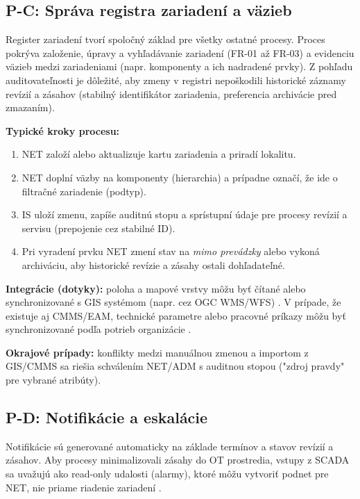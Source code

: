 \subsection{P-C: Správa registra zariadení a väzieb}
\label{sec:process-pc}

Register zariadení tvorí spoločný základ pre všetky ostatné procesy.
Proces pokrýva založenie, úpravy a vyhľadávanie zariadení (FR-01 až FR-03) a evidenciu väzieb medzi zariadeniami (napr. komponenty a ich nadradené prvky).
Z pohľadu auditovateľnosti je dôležité, aby zmeny v registri nepoškodili historické záznamy revízií a zásahov (stabilný identifikátor zariadenia, preferencia archivácie pred zmazaním).

\textbf{Typické kroky procesu:}
\begin{enumerate}[label=\arabic*.]
\item NET založí alebo aktualizuje kartu zariadenia a priradí lokalitu.
\item NET doplní väzby na komponenty (hierarchia) a prípadne označí, že ide o filtračné zariadenie (podtyp).
\item IS uloží zmenu, zapíše auditnú stopu a sprístupní údaje pre procesy revízií a servisu (prepojenie cez stabilné ID).
\item Pri vyradení prvku NET zmení stav na \emph{mimo prevádzky} alebo vykoná archiváciu, aby historické revízie a zásahy ostali dohľadateľné.
\end{enumerate}

\textbf{Integrácie (dotyky):} poloha a mapové vrstvy môžu byť čítané alebo synchronizované s GIS systémom (napr. cez OGC WMS/WFS) \cite{OGCWMS2006,OGCWFS,QGISDocs}. V prípade, že existuje aj CMMS/EAM, technické parametre alebo pracovné príkazy môžu byť synchronizované podľa potrieb organizácie \cite{ISO55000}.

\textbf{Okrajové prípady:} konflikty medzi manuálnou zmenou a importom z GIS/CMMS sa riešia schválením NET/ADM s auditnou stopou ("zdroj pravdy" pre vybrané atribúty).

\subsection{P-D: Notifikácie a eskalácie}
\label{sec:process-pd}

Notifikácie sú generované automaticky na základe termínov a stavov revízií a zásahov.
Aby procesy minimalizovali zásahy do OT prostredia, vstupy z SCADA sa uvažujú ako read-only udalosti (alarmy), ktoré môžu vytvoriť podnet pre NET, nie priame riadenie zariadení \cite{NIST80082R3,ISAIEC62443}.


